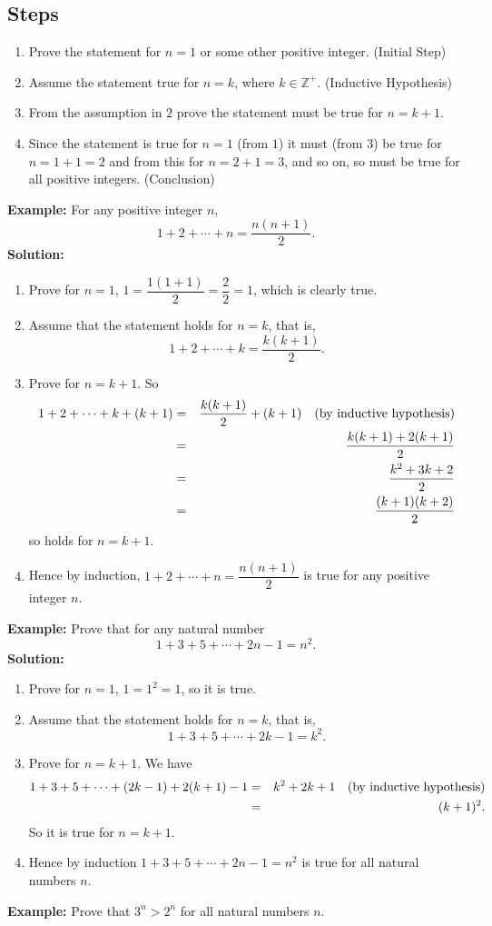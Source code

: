 \documentclass[titlepage,a4paper,12pt]{report}
\begin{document}
\subsection{Steps}
\begin{enumerate}
\item Prove the statement for $n=1$ or some other positive integer. (Initial Step)
\item Assume the statement true for $n=k$, where $k\in \mathbb{Z}^+$. (Inductive Hypothesis)
\item From the assumption in $2$ prove the statement must be true for $n=k+1$.
\item Since the statement is true for $n=1$ (from $1$) it must (from $3$) be true for $n=1+1=2$ and from this for $n=2+1=3$, and so on, so must be true for all positive integers. (Conclusion)
\end{enumerate}
\textbf{Example:} For any positive integer $n$, 
\[1+2+\cdots + n=\dfrac{n(n+1)}{2}.\]
\textbf{Solution:} \begin{enumerate}
\item Prove for $n=1$, $1=\dfrac{1(1+1)}{2}=\dfrac{2}{2}=1$, which is clearly true.
\item Assume that the statement holds for $n=k$, that is, 
\[1+2+\cdots +k =\dfrac{k(k+1)}{2}.\]
\item Prove for $n=k+1$. So 
\begin{eqnarray*}
1+2+\cdots + k+(k+1) &=& \dfrac{k(k+1)}{2}+(k+1)\quad \hbox{(by inductive hypothesis)}\\
&=& \dfrac{k(k+1)+2(k+1)}{2}\\
&=& \dfrac{k^2+3k+2}{2}\\
&=& \dfrac{(k+1)(k+2)}{2}
\end{eqnarray*}
so holds for $n=k+1$.
\item Hence by induction, $1+2+\cdots +n=\dfrac{n(n+1)}{2}$ is true for any positive integer $n$.
\end{enumerate}
\textbf{Example:} Prove that for any natural number 
\begin{equation*}
1+3+5+\cdots + 2n-1=n^2.
\end{equation*}
\textbf{Solution:} \begin{enumerate}
\item Prove for $n=1$, $1=1^2=1$, so it is true.
\item Assume that the statement holds for $n=k$, that is, 
\begin{equation*}
1+3+5+\cdots +2k-1=k^2.
\end{equation*} 
\item Prove for $n=k+1$. We have 
\begin{eqnarray*}
1+3+5+\cdots +(2k-1)+2(k+1)-1 &=& k^2+2k+1\quad \hbox{(by inductive hypothesis)}\\
&=& (k+1)^2.
\end{eqnarray*}
So it is true for $n=k+1$. 
\item Hence by induction  $1+3+5+\cdots + 2n-1=n^2$ is true for all natural numbers $n$.
\end{enumerate}
\newpage
\textbf{Example:} Prove that $3^n>2^n$ for all natural numbers $n$.\\
\end{document}
